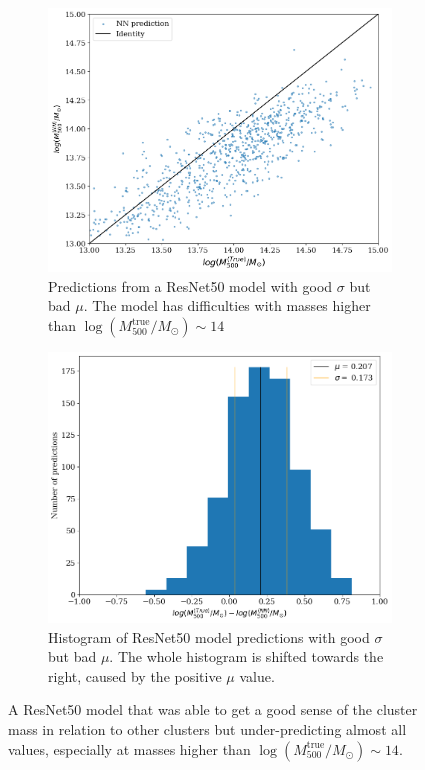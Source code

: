 \begin{figure}[H]
\centering
\begin{subfigure}{.46\textwidth}
\centering
\includegraphics[width=\textwidth]{images/Chapter4/ResNet50/best_but_not_pred.png}
\caption{Predictions from a ResNet50 model with good $\sigma$ but bad $\mu$. The model has difficulties with masses higher than $\log{(M_{500}^{\text{true}}/M_{\odot})} \sim 14$} 
\label{fig:bad_mu}
\end{subfigure}
\hspace{.6em}
\begin{subfigure}{.46\textwidth}
\centering
\includegraphics[width=\textwidth]{images/Chapter4/ResNet50/best_but_not.png}
\caption{Histogram of ResNet50 model predictions with good $\sigma$ but bad $\mu$. The whole histogram is shifted towards the right, caused by the positive $\mu$ value.} 
\label{fig:bad_mu_hist}
\end{subfigure}
\caption{A ResNet50 model that was able to get a good sense of the cluster mass in relation to other clusters but under-predicting almost all values, especially at masses higher than $\log{(M_{500}^{\text{true}}/M_{\odot})} \sim 14$.}
\label{fig:bad_mu_comp}
\end{figure}




